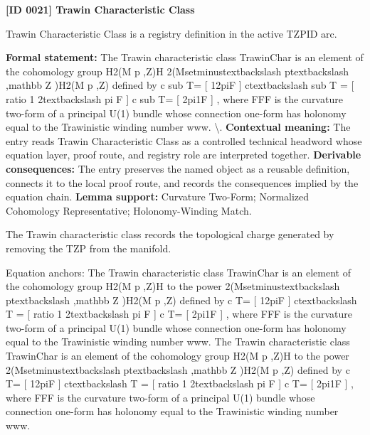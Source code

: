 \clearpage
\noindent\textbf{[ID 0021] Trawin Characteristic Class}\par
\vspace{0.35em}
\begingroup\small
{}
Trawin Characteristic Class is a registry definition in the active TZPID arc.

\begingroup\footnotesize\setlength{\emergencystretch}{3em}\sloppy
\textbf{Formal statement:} The Trawin characteristic class TrawinChar is an element of the cohomology group H2(M  p ,Z)H 2(Msetminustextbackslash ptextbackslash ,mathbb Z )H2(M  p ,Z) defined by c sub T= [ 12piF ] ctextbackslash sub T = [ ratio 1 2textbackslash pi F ] c sub T= [ 2pi1F ] , where FFF is the curvature two-form of a principal U(1) bundle whose connection one-form has holonomy equal to the Trawinistic winding number www. \textbackslash{}. \textbf{Contextual meaning:} The entry reads Trawin Characteristic Class as a controlled technical headword whose equation layer, proof route, and registry role are interpreted together. \textbf{Derivable consequences:} The entry preserves the named object as a reusable definition, connects it to the local proof route, and records the consequences implied by the equation chain. \textbf{Lemma support:} Curvature Two-Form; Normalized Cohomology Representative; Holonomy-Winding Match.\par
\endgroup

The Trawin characteristic class records the topological charge generated by removing the TZP from the manifold.

Equation anchors: The Trawin characteristic class TrawinChar is an element of the cohomology group H2(M  p ,Z)H to the power 2(Msetminustextbackslash ptextbackslash ,mathbb Z )H2(M  p ,Z) defined by c T= [ 12piF ] ctextbackslash T = [ ratio 1 2textbackslash pi F ] c T= [ 2pi1F ] , where FFF is the curvature two-form of a principal U(1) bundle whose connection one-form has holonomy equal to the Trawinistic winding number www. The Trawin characteristic class TrawinChar is an element of the cohomology group H2(M  p ,Z)H to the power 2(Msetminustextbackslash ptextbackslash ,mathbb Z )H2(M  p ,Z) defined by c T= [ 12piF ] ctextbackslash T = [ ratio 1 2textbackslash pi F ] c T= [ 2pi1F ] , where FFF is the curvature two-form of a principal U(1) bundle whose connection one-form has holonomy equal to the Trawinistic winding number www.


